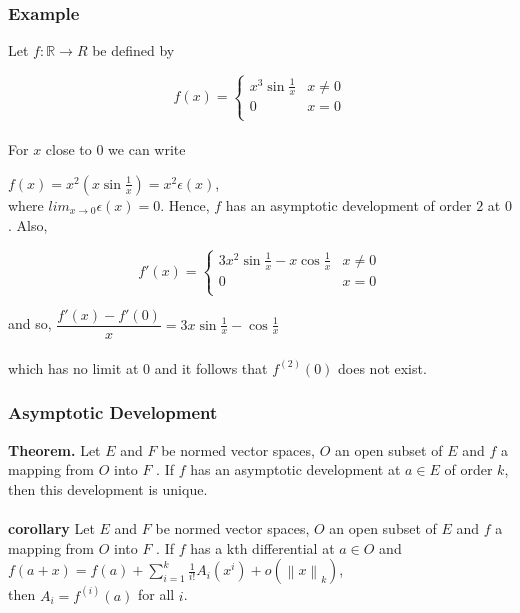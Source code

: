 \documentclass{beamer}
\newcommand{\R}{\mathbb{R}}
\newcommand\norm[1]{\left\lVert#1\right\rVert}
\begin{document}
\begin{frame}
\frametitle{Example}
Let $f : \R \to R$ be defined by

\hspace*{3cm}  \[ f(x) = \begin{cases} 
							 x^3 \sin \frac{1}{x} & x \neq 0 \\
							 0 & x = 0\\
							 \end{cases}
							 \]
\\
For $x$ close to $0$ we can write


\hspace*{3cm} $f(x) = x^2 ( x \sin \frac{1}{x}) = x^2 \epsilon(x)$,\\

where $lim_{x \to 0} \epsilon (x) = 0$. Hence, $f$ has an asymptotic development of order $2$ at $0$. Also,

\hspace*{3cm}  \[ f'(x) = \begin{cases} 
							 3x^2 \sin \frac{1}{x} - x \cos \frac{1}{x} & x \neq 0 \\
							 0 & x = 0\\
							 \end{cases}
							 \]
			
and so,
\hspace*{3cm} $\dfrac{f'(x) - f'(0)}{x} = 3x \sin \frac{1}{x} - \cos \frac{1}{x}$\\~\\
which has no limit at $0$ and it follows that $f^{(2)}(0)$ does not exist.\\



\end{frame}

\begin{frame}
\frametitle{Asymptotic Development}

\textbf{Theorem.} Let $E$ and $F$ be normed vector spaces, $O$ an open subset of $E$ and $f$ a mapping from $O$ into $F$ . If $f$ has an asymptotic development at $a \in E$ of order $k$, then this development is unique.\\~\\



\textbf{corollary} Let $E$ and $F$ be normed vector spaces, $O$ an open subset of $E$ and $f$ a mapping from  $O$ into $F$ . If $f$ has a kth differential at $a \in O$ and\\

\hspace{3cm} $f(a+x) = f(a) + \sum_{i=1}^k \frac{1}{i!} A_i (x^i) + o(\norm{x}_k)$,\\

then $A_i = f^{(i)} (a)$ for all $i$.

\end{frame}
\end{document}
